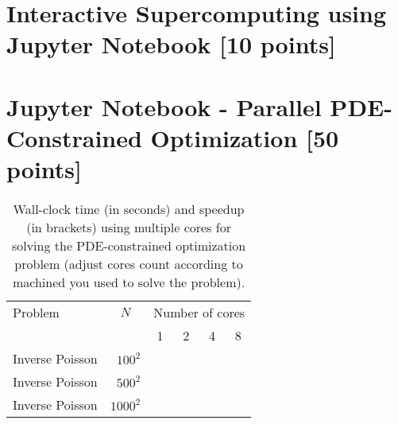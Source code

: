 \documentclass[unicode,11pt,a4paper,oneside,numbers=endperiod,openany]{scrartcl}
\begin{document}

\section{Interactive Supercomputing using Jupyter Notebook  [10 points]}




\section{Jupyter Notebook - Parallel PDE-Constrained Optimization [50 points]}


\begin{table}[h]
	\caption{Wall-clock time (in seconds) and speedup (in brackets) using multiple cores for solving the PDE-constrained optimization problem  (adjust cores count according to machined you used to solve the problem).}
	\centering
	\medskip
	\begin{tabular}{l|r||r|r|r|r}\hline\hline
		Problem & \multicolumn{1}{c||}{$N$} &  \multicolumn{4}{c}{Number of cores} \\
		&       & \multicolumn{1}{c|}{1} & \multicolumn{1}{c|}{2} & \multicolumn{1}{c|}{4} & \multicolumn{1}{c}{8} \\
		\hline\hline
		{ Inverse Poisson} & $100^2$  &    \phantom{222222}        &    \phantom{222222}      & \phantom{222222}         &      \phantom{222222} \\
		{ Inverse  Poisson} & $500^2$ &            &          &          &       \\
		{ Inverse Poisson} & $1000^2$ &            &          &          &       \\\hline \hline
	\end{tabular}
	\label{tab:PDEparallel}
\end{table}
\end{document}
